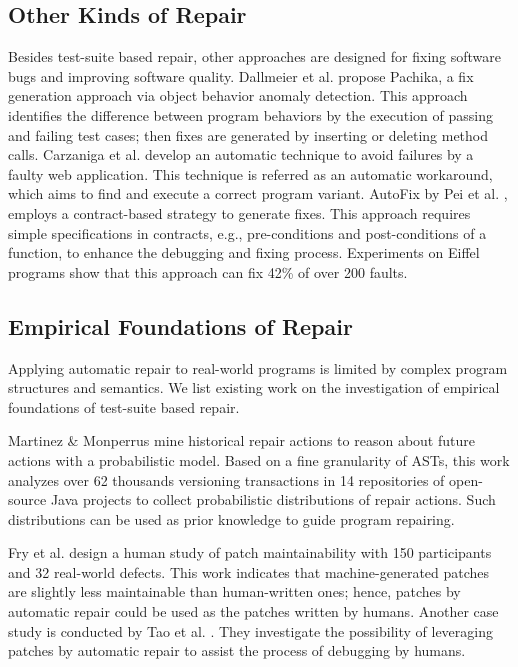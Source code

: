 \subsection{Other Kinds of Repair}
\label{subsect:other-kinf-repair}

Besides test-suite based repair, other approaches are designed for fixing software bugs and improving software quality. 
Dallmeier et al. \cite{dallmeier2009generating} propose Pachika, a fix generation approach via object behavior anomaly detection. This approach identifies the difference between program behaviors by the execution of passing and failing test cases; then fixes are generated by inserting or deleting method calls. 
Carzaniga et al. \cite{carzaniga2010automatic} develop an automatic technique to avoid failures by a faulty web application. This technique is referred as an automatic workaround, which aims to find and execute a correct program variant. 
AutoFix by Pei et al. \cite{pei2014automated}, employs a contract-based strategy to generate fixes. This approach requires simple specifications in contracts, e.g., pre-conditions and post-conditions of a function, to enhance the debugging and fixing process. Experiments on Eiffel programs show that this approach can fix 42\% of over 200 faults.  

\subsection{Empirical Foundations of Repair}
\label{subsect:related-foundation}

Applying automatic repair to real-world programs is limited by complex program structures and semantics. We list existing work on the investigation of empirical foundations of test-suite based repair. 

Martinez \& Monperrus \cite{Martinez2013} mine historical repair actions to reason about future actions with a probabilistic model. Based on a fine granularity of ASTs, this work analyzes over 62 thousands versioning transactions in 14 repositories of open-source Java projects to collect probabilistic distributions of repair actions. Such distributions can be used as prior knowledge to guide program repairing. 

Fry et al. \cite{DBLP:conf/issta/FryLW12} design a human study of patch maintainability with 150 participants and 32 real-world defects. This work indicates that machine-generated patches are slightly less maintainable than human-written ones; hence, patches by automatic repair could be used as the patches written by humans. Another case study is conducted by Tao et al. \cite{DBLP:conf/sigsoft/TaoKKX14}. They investigate the possibility of leveraging patches by automatic repair to assist the process of debugging by humans.  

